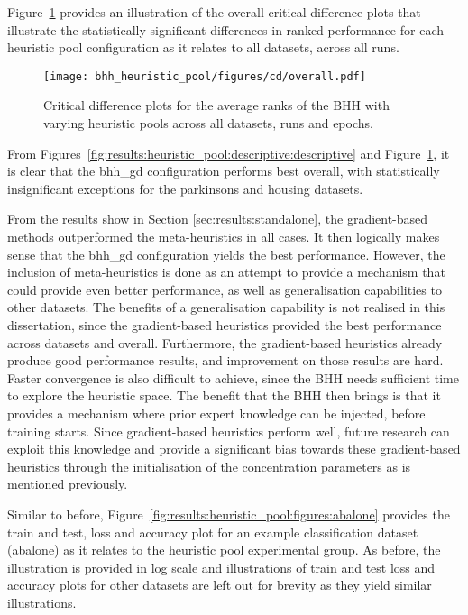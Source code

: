 Figure~\ref{fig:results:heuristic_pool:descriptive:cd} provides an illustration of the overall critical difference plots that illustrate the statistically significant differences in ranked performance for each heuristic pool configuration as it relates to all datasets, across all runs.

\begin{figure}[htbp]
	\centering
	\texttt{[image: bhh\_heuristic\_pool/figures/cd/overall.pdf]}
	\caption{Critical difference plots for the average ranks of the \acs{BHH} with varying heuristic pools across all datasets, runs and epochs.}
	\label{fig:results:heuristic_pool:descriptive:cd}
\end{figure}

From Figures~\ref{fig:results:heuristic_pool:descriptive:descriptive} and Figure~\ref{fig:results:heuristic_pool:descriptive:cd}, it is clear that the bhh\_gd configuration performs best overall, with statistically insignificant exceptions for the parkinsons and housing datasets.

From the results show in Section \ref{sec:results:standalone}, the gradient-based methods outperformed the meta-heuristics in all cases. It then logically makes sense that the bhh\_gd configuration yields the best performance. However, the inclusion of meta-heuristics is done as an attempt to provide a mechanism that could provide even better performance, as well as generalisation capabilities to other datasets. The benefits of a generalisation capability is not realised in this dissertation, since the gradient-based heuristics provided the best performance across datasets and overall. Furthermore, the gradient-based heuristics already produce good performance results, and improvement on those results are hard. Faster convergence is also difficult to achieve, since the \acs{BHH} needs sufficient time to explore the heuristic space. The benefit that the \acs{BHH} then brings is that it provides a mechanism where prior expert knowledge can be injected, before training starts. Since gradient-based heuristics perform well, future research can exploit this knowledge and provide a significant bias towards these gradient-based heuristics through the initialisation of the concentration parameters as is mentioned previously.

Similar to before, Figure~\ref{fig:results:heuristic_pool:figures:abalone} provides the train and test, loss and accuracy plot for an example classification dataset (abalone) as it relates to the heuristic pool experimental group. As before, the illustration is provided in log scale and illustrations of train and test loss and accuracy plots for other datasets are left out for brevity as they yield similar illustrations.

